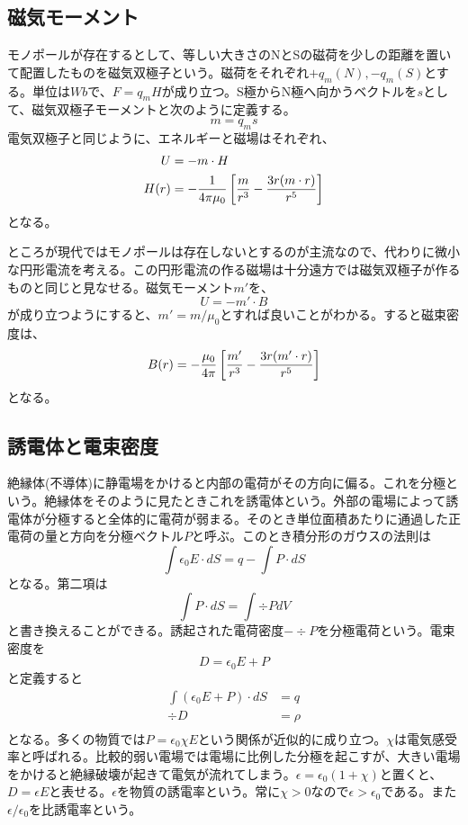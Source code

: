 \subsection{磁気モーメント}
    モノポールが存在するとして、等しい大きさのNとSの磁荷を少しの距離を置いて配置したものを磁気双極子という。磁荷をそれぞれ$+q_m(N), -q_m(S)$とする。単位は$Wb$で、$F = q_m H$が成り立つ。S極からN極へ向かうベクトルを$s$として、磁気双極子モーメントと次のように定義する。
        \[m = q_m s\]
    電気双極子と同じように、エネルギーと磁場はそれぞれ、
    \begin{align*}
        U &= -m \cdot H\\
        H(r) &= -\frac{1}{4\pi\mu_0}\left[\frac{m}{r^3} - \frac{3r(m\cdot r)}{r^5} \right]
    \end{align*}
    となる。

    ところが現代ではモノポールは存在しないとするのが主流なので、代わりに微小な円形電流を考える。この円形電流の作る磁場は十分遠方では磁気双極子が作るものと同じと見なせる。磁気モーメント$m'$を、
        \[U = -m' \cdot B\]
    が成り立つようにすると、$m' = m / \mu_0$とすれば良いことがわかる。すると磁束密度は、
        \[B(r) = -\frac{\mu_0}{4\pi}\left[\frac{m'}{r^3} - \frac{3r(m'\cdot r)}{r^5} \right]\]
    となる。

\subsection{誘電体と電束密度}
    絶縁体(不導体)に静電場をかけると内部の電荷がその方向に偏る。これを分極という。絶縁体をそのように見たときこれを誘電体という。外部の電場によって誘電体が分極すると全体的に電荷が弱まる。そのとき単位面積あたりに通過した正電荷の量と方向を分極ベクトル$P$と呼ぶ。このとき積分形のガウスの法則は
        \[\int \epsilon_0 E \cdot dS = q - \int P \cdot dS\]
    となる。第二項は
        \[\int P \cdot dS = \int \div P dV\]
    と書き換えることができる。誘起された電荷密度$-\div P$を分極電荷という。電束密度を
        \[D = \epsilon_0 E + P\]
    と定義すると
    \begin{align*}
        \int (\epsilon_0 E + P) \cdot dS &= q\\
        \div D &= \rho\\
    \end{align*}
    となる。多くの物質では$P = \epsilon_0\chi E$という関係が近似的に成り立つ。$\chi$は電気感受率と呼ばれる。比較的弱い電場では電場に比例した分極を起こすが、大きい電場をかけると絶縁破壊が起きて電気が流れてしまう。$\epsilon = \epsilon_0(1 + \chi)$と置くと、$D = \epsilon E$と表せる。$\epsilon$を物質の誘電率という。常に$\chi > 0$なので$\epsilon > \epsilon_0$である。また$\epsilon / \epsilon_0$を比誘電率という。

